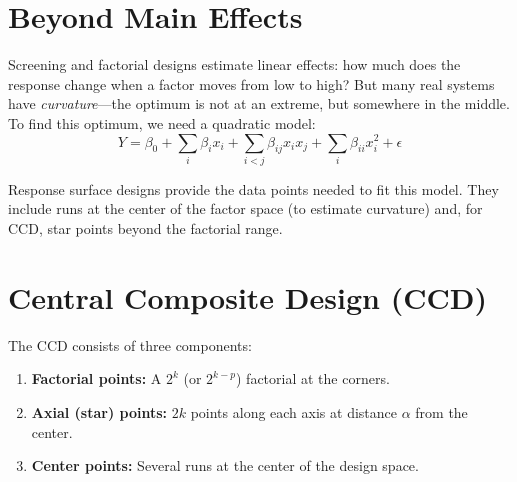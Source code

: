 \documentclass[11pt]{book}
\begin{document}
\section{Beyond Main Effects}

Screening and factorial designs estimate linear effects: how much does the
response change when a factor moves from low to high? But many real systems have
\emph{curvature}---the optimum is not at an extreme, but somewhere in the
middle. To find this optimum, we need a quadratic model:
\[
Y = \beta_0 + \sum_i \beta_i x_i + \sum_{i<j} \beta_{ij} x_i x_j
+ \sum_i \beta_{ii} x_i^2 + \epsilon
\]

Response surface designs provide the data points needed to fit this model. They
include runs at the center of the factor space (to estimate curvature) and,
for CCD, star points beyond the factorial range.

\section{Central Composite Design (CCD)}

The CCD consists of three components:

\begin{enumerate}[nosep]
\item \textbf{Factorial points:} A $2^k$ (or $2^{k-p}$) factorial at the corners.
\item \textbf{Axial (star) points:} $2k$ points along each axis at distance
      $\alpha$ from the center.
\item \textbf{Center points:} Several runs at the center of the design space.
\end{enumerate}
\end{document}
